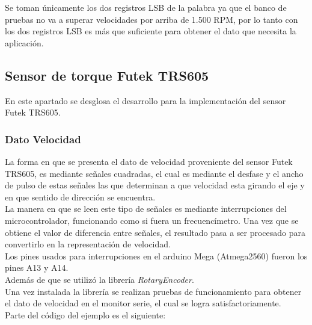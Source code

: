 \documentclass[12pt,titlepage]{article}
\begin{document}
Se toman únicamente los dos registros LSB de la palabra ya que el banco de pruebas no va a superar velocidades por arriba de 1.500 RPM, por lo tanto con los dos registros LSB es más que suficiente para obtener el dato que necesita la aplicación. \\  
\newpage
\subsection{Sensor de torque Futek TRS605}
En este apartado se desglosa el desarrollo para la implementación del sensor Futek TRS605. 
\subsubsection{Dato Velocidad }
La forma en que se presenta el dato de velocidad proveniente del sensor Futek TRS605, es mediante señales cuadradas, el cual es mediante el desfase  y el ancho de pulso de estas señales las que determinan a que velocidad esta girando el eje y en que sentido de dirección se encuentra. \\ 

La manera en que se leen este tipo de señales es mediante interrupciones del microcontrolador, funcionando  como si fuera un frecuencímetro. Una vez que se obtiene el valor de diferencia entre señales, el resultado pasa a ser procesado para convertirlo en la representación de velocidad. \\ 

Los pines usados para interrupciones en el arduino Mega (Atmega2560) fueron los pines A13 y A14. \\ 

Además de que se utilizó la librería \textit{RotaryEncoder}. \\

Una vez instalada la librería se realizan pruebas de funcionamiento para obtener el dato de velocidad en el monitor serie, el cual se logra satisfactoriamente. \\

Parte del código del ejemplo es el siguiente: \\ 
\end{document}
